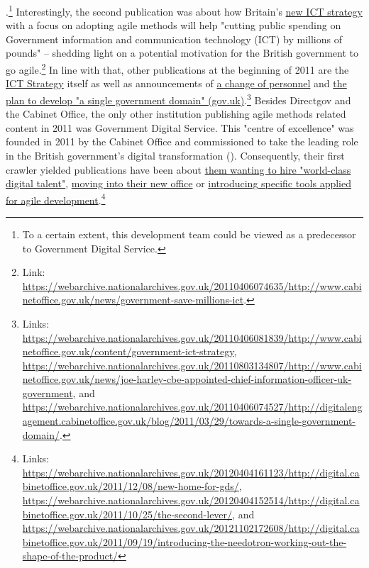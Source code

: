 {{}.}\footnote{To a certain extent, this development team could be viewed as a predecessor to Government Digital Service.} Interestingly, the second publication was about how Britain's \href{https://webarchive.nationalarchives.gov.uk/20110406081839/http://www.cabinetoffice.gov.uk/content/government-ict-strategy}{new ICT strategy} with a focus on adopting agile methods will help "cutting public spending on Government information and communication technology (ICT) by millions of pounds" – shedding light on a potential motivation for the British government to go agile.\footnote{Link: \url{https://webarchive.nationalarchives.gov.uk/20110406074635/http://www.cabinetoffice.gov.uk/news/government-save-millions-ict}.} In line with that, other publications at the beginning of 2011 are the \href{https://webarchive.nationalarchives.gov.uk/20110406081839/http://www.cabinetoffice.gov.uk/content/government-ict-strategy}{ICT Strategy} itself as well as announcements of \href{https://webarchive.nationalarchives.gov.uk/20110803134807/http://www.cabinetoffice.gov.uk/news/joe-harley-cbe-appointed-chief-information-officer-uk-government}{a change of personnel} and \href{https://webarchive.nationalarchives.gov.uk/20110406074527/http://digitalengagement.cabinetoffice.gov.uk/blog/2011/03/29/towards-a-single-government-domain/}{the plan to develop "a single government domain" (gov.uk)}.\footnote{Links: \url{https://webarchive.nationalarchives.gov.uk/20110406081839/http://www.cabinetoffice.gov.uk/content/government-ict-strategy}, \url{https://webarchive.nationalarchives.gov.uk/20110803134807/http://www.cabinetoffice.gov.uk/news/joe-harley-cbe-appointed-chief-information-officer-uk-government}, and \url{https://webarchive.nationalarchives.gov.uk/20110406074527/http://digitalengagement.cabinetoffice.gov.uk/blog/2011/03/29/towards-a-single-government-domain/}.} Besides Directgov and the Cabinet Office, the only other institution publishing agile methods related content in 2011 was Government Digital Service. This "centre of excellence" was founded in 2011 by the Cabinet Office and commissioned to take the leading role in the British government's digital transformation (\cite{GovernmentDigitalService2020}). Consequently, their first crawler yielded publications have been about \href{https://webarchive.nationalarchives.gov.uk/20120404152514/http://digital.cabinetoffice.gov.uk/2011/10/25/the-second-lever/}{them wanting to hire "world-class digital talent"}, \href{https://webarchive.nationalarchives.gov.uk/20120404161123/http://digital.cabinetoffice.gov.uk/2011/12/08/new-home-for-gds/}{moving into their new office} or \href{https://webarchive.nationalarchives.gov.uk/20121102172608/http://digital.cabinetoffice.gov.uk/2011/09/19/introducing-the-needotron-working-out-the-shape-of-the-product/}{introducing specific tools applied for agile development}.\footnote{Links: \url{https://webarchive.nationalarchives.gov.uk/20120404161123/http://digital.cabinetoffice.gov.uk/2011/12/08/new-home-for-gds/}, \url{https://webarchive.nationalarchives.gov.uk/20120404152514/http://digital.cabinetoffice.gov.uk/2011/10/25/the-second-lever/}, and \url{https://webarchive.nationalarchives.gov.uk/20121102172608/http://digital.cabinetoffice.gov.uk/2011/09/19/introducing-the-needotron-working-out-the-shape-of-the-product/}} 
